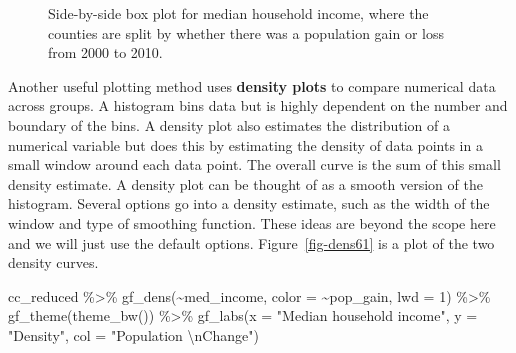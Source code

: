 \documentclass[
  letterpaper,
  DIV=11,
  numbers=noendperiod]{scrreprt}
\newenvironment{Shaded}{\begin{snugshade}}{\end{snugshade}}
\newcommand{\AttributeTok}[1]{\textcolor[rgb]{0.40,0.45,0.13}{#1}}
\newcommand{\DecValTok}[1]{\textcolor[rgb]{0.68,0.00,0.00}{#1}}
\newcommand{\FunctionTok}[1]{\textcolor[rgb]{0.28,0.35,0.67}{#1}}
\newcommand{\NormalTok}[1]{\textcolor[rgb]{0.00,0.23,0.31}{#1}}
\newcommand{\SpecialCharTok}[1]{\textcolor[rgb]{0.37,0.37,0.37}{#1}}
\newcommand{\StringTok}[1]{\textcolor[rgb]{0.13,0.47,0.30}{#1}}
\begin{document}
\begin{figure}[H]


\caption{\label{fig-sbysbox61}Side-by-side box plot for median household
income, where the counties are split by whether there was a population
gain or loss from 2000 to 2010.}

\end{figure}%

Another useful plotting method uses \textbf{density plots} to compare
numerical data across groups. A histogram bins data but is highly
dependent on the number and boundary of the bins. A density plot also
estimates the distribution of a numerical variable but does this by
estimating the density of data points in a small window around each data
point. The overall curve is the sum of this small density estimate. A
density plot can be thought of as a smooth version of the histogram.
Several options go into a density estimate, such as the width of the
window and type of smoothing function. These ideas are beyond the scope
here and we will just use the default options. Figure~\ref{fig-dens61}
is a plot of the two density curves.

\begin{Shaded}
\begin{Highlighting}[]
\NormalTok{cc\_reduced }\SpecialCharTok{\%\textgreater{}\%}
  \FunctionTok{gf\_dens}\NormalTok{(}\SpecialCharTok{\textasciitilde{}}\NormalTok{med\_income, }\AttributeTok{color =} \SpecialCharTok{\textasciitilde{}}\NormalTok{pop\_gain, }\AttributeTok{lwd =} \DecValTok{1}\NormalTok{) }\SpecialCharTok{\%\textgreater{}\%}
  \FunctionTok{gf\_theme}\NormalTok{(}\FunctionTok{theme\_bw}\NormalTok{()) }\SpecialCharTok{\%\textgreater{}\%}
  \FunctionTok{gf\_labs}\NormalTok{(}\AttributeTok{x =} \StringTok{"Median household income"}\NormalTok{, }\AttributeTok{y =} \StringTok{"Density"}\NormalTok{, }\AttributeTok{col =} \StringTok{"Population }\SpecialCharTok{\textbackslash{}n}\StringTok{Change"}\NormalTok{)}
\end{Highlighting}
\end{Shaded}
\end{document}
